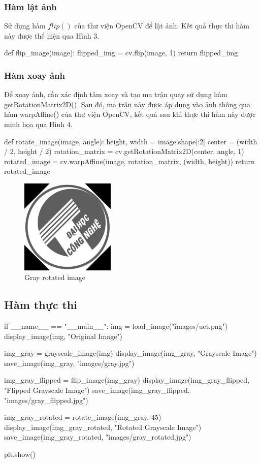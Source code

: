 \documentclass[a4paper]{article}
\begin{document}
\subsubsection{Hàm lật ảnh}
Sử dụng hàm $flip()$ của thư viện OpenCV để lật ảnh. Kết quả thực thi hàm này được thể hiện qua Hình 3.
\begin{python}
def flip_image(image):
    flipped_img = cv.flip(image, 1)
    return flipped_img
\end{python}
\subsubsection{Hàm xoay ảnh}
Để xoay ảnh, cần xác định tâm xoay và tạo ma trận quay sử dụng hàm getRotationMatrix2D(). Sau đó, ma trận này được áp dụng vào ảnh thông qua hàm warpAffine() của thư viện OpenCV, kết quả sau khi thực thi hàm này được minh họa qua Hình 4.
\begin{python}
def rotate_image(image, angle):
    height, width = image.shape[:2]
    center = (width / 2, height / 2)
    rotation_matrix = cv.getRotationMatrix2D(center, angle, 1)
    rotated_image = cv.warpAffine(image, rotation_matrix, (width, height))
    return rotated_image
\end{python}
\begin{figure}[ht]
  \centering
  \includegraphics[width=0.4\textwidth]{images/gray_rotated.jpg}
  \caption{Gray rotated image}
\end{figure}
\subsection{Hàm thực thi}
\begin{python}
if __name__ == "__main__":
    img = load_image("images/uet.png")
    display_image(img, "Original Image")

    img_gray = grayscale_image(img)
    display_image(img_gray, "Grayscale Image")
    save_image(img_gray, "images/gray.jpg")

    img_gray_flipped = flip_image(img_gray)
    display_image(img_gray_flipped, "Flipped Grayscale Image")
    save_image(img_gray_flipped, "images/gray_flipped.jpg")

    img_gray_rotated = rotate_image(img_gray, 45)
    display_image(img_gray_rotated, "Rotated Grayscale Image")
    save_image(img_gray_rotated, "images/gray_rotated.jpg")

    plt.show() 
\end{python}
\end{document}
